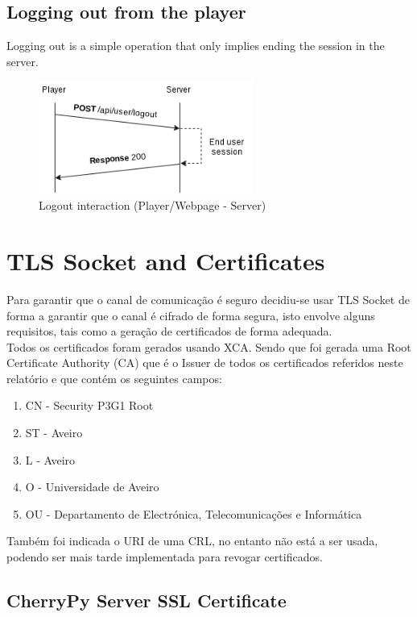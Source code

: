 \documentclass[11pt,a4paper]{report}
\begin{document}
\section{Logging out from the player}
Logging out is a simple operation that only implies ending the session in the server.

\begin{figure}[H]
\centerline{\includegraphics[width=200pt]{images/logout.png}}
\caption{Logout interaction (Player/Webpage - Server)}
\label{player}
\end{figure}

\chapter{TLS Socket and Certificates}
\label{sec:certs}
Para garantir que o canal de comunicação é seguro decidiu-se usar TLS Socket de forma a garantir que o canal é cifrado de forma segura, isto envolve alguns requisitos, tais como a geração de certificados de forma adequada.\\

Todos os certificados foram gerados usando XCA.
Sendo que foi gerada uma Root Certificate Authority (CA) que é o Issuer de todos os certificados referidos neste relatório e que contém os seguintes campos:
\begin{enumerate}
\item CN - Security P3G1 Root
\item ST - Aveiro
\item L - Aveiro
\item O - Universidade de Aveiro
\item OU - Departamento de Electrónica, Telecomunicações e Informática
\end{enumerate}
Também foi indicada o URI de uma CRL, no entanto não está a ser usada, podendo ser mais tarde implementada para revogar certificados.

\section{CherryPy Server SSL Certificate}
\end{document}
